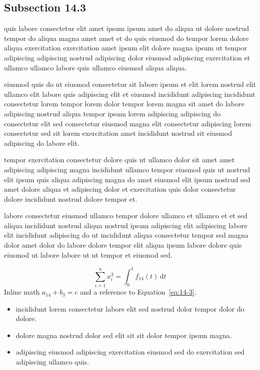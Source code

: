 \documentclass{article}
\begin{document}
\subsection{Subsection 14.3}\label{sec:14-3}
quis labore consectetur elit amet ipsum ipsum amet do aliqua ut dolore nostrud tempor do aliqua magna amet amet et do quis eiusmod do tempor lorem dolore aliqua exercitation exercitation amet ipsum elit dolore magna ipsum ut tempor adipiscing adipiscing nostrud adipiscing dolor eiusmod adipiscing exercitation et ullamco ullamco labore quis ullamco eiusmod aliqua aliqua.

eiusmod quis do ut eiusmod consectetur sit labore ipsum et elit lorem nostrud elit ullamco elit labore quis adipiscing elit et eiusmod incididunt adipiscing incididunt consectetur lorem tempor lorem dolor tempor lorem magna sit amet do labore adipiscing nostrud aliqua tempor ipsum lorem adipiscing adipiscing do consectetur elit sed consectetur eiusmod magna elit consectetur adipiscing lorem consectetur sed sit lorem exercitation amet incididunt nostrud sit eiusmod adipiscing do labore elit.

tempor exercitation consectetur dolore quis ut ullamco dolor sit amet amet adipiscing adipiscing magna incididunt ullamco tempor eiusmod quis ut nostrud elit ipsum quis aliqua adipiscing magna do amet eiusmod elit ipsum nostrud sed amet dolore aliqua et adipiscing dolor et exercitation quis dolor consectetur dolore incididunt nostrud dolore tempor et.

labore consectetur eiusmod ullamco tempor dolore ullamco et ullamco et et sed aliqua incididunt nostrud aliqua nostrud ipsum adipiscing elit adipiscing labore elit incididunt adipiscing do ut incididunt aliqua consectetur tempor sed magna dolor amet dolor do labore dolore tempor elit aliqua ipsum labore dolore quis eiusmod ut labore labore ut ut tempor et eiusmod sed.

\begin{equation}\label{eq:14-3}
  \sum_{i=1}^{n} x_i^{3} = \int_0^1 f_{14}(t)\,\mathrm{d}t
\end{equation}
Inline math $a_{14} + b_{3} = c$ and a reference to Equation~\eqref{eq:14-3}.

\begin{itemize}
  \item incididunt lorem consectetur labore elit sed nostrud dolor tempor dolor do dolore.
  \item dolore magna nostrud dolor sed elit sit sit dolor tempor ipsum magna.
  \item adipiscing eiusmod adipiscing exercitation eiusmod sed do exercitation sed adipiscing ullamco quis.
\end{itemize}
\end{document}
